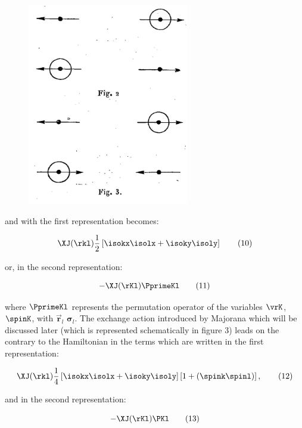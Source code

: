 \documentclass{article}
\newcommand{\var}[1]{\pmb{#1}}
\newcommand{\comp}[1]{{#1}}
\newcommand{\vect}[1]{\vec{\var{#1}}}
\newcommand{\vrX}[1]{\vect{r}_{\comp{#1}}}
\newcommand{\spinX}[1]{\var{\sigma}_{\comp{#1}}}
\newcommand{\nequ}[2]{
\begin{equation*}
#1
\tag{#2}
\end{equation*}
}
\begin{document}
\begin{figure}[h!]
\centering
\includegraphics[width=200pt]{images/Fig2Fig3}
\end{figure}

and with the first representation becomes:
\nequ{
\XJ(\rkl)\frac{1}{2}\left[ \isokx\isolx + \isoky\isoly \right]
}{10}

or, in the second representation:

\nequ{
-\XJ(\rKl)\PprimeKl
}{11}

where $\PprimeKl$ represents the permutation operator of the variables $\vrK$, $\spinK$, with $\vrX{l}$ $\spinX{l}$.
The exchange action introduced by Majorana which will be discussed later (which is represented schematically in figure 3) leads on the contrary to the Hamiltonian in the terms which are written in the first representation:

\nequ{
\XJ(\rkl)\frac{1}{4}\left[ \isokx\isolx + \isoky\isoly \right]\left[ 1 + (\spink\spinl) \right],
}{12}

and in the second representation:

\nequ{
-\XJ(\rKl)\PKl
}{13}
\end{document}
